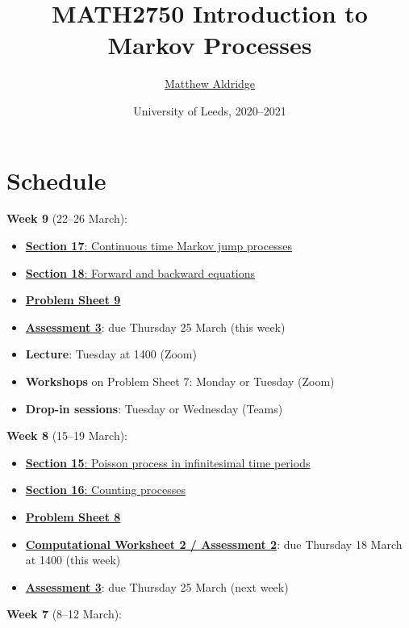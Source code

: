 \documentclass[
  a4paper,
]{article}
\title{MATH2750 Introduction to Markov Processes}
\author{\href{mailto:m.aldridge@leeds.ac.uk}{Matthew Aldridge}}
\date{University of Leeds, 2020--2021}
\providecommand{\tightlist}{%
  \setlength{\itemsep}{0pt}\setlength{\parskip}{0pt}}
\theoremstyle{definition}
\theoremstyle{definition}
\theoremstyle{definition}
\theoremstyle{remark}
\begin{document}
\maketitle

{
\setcounter{tocdepth}{2}
\tableofcontents
}
\hypertarget{home}{%
\section*{Schedule}\label{home}}

\textbf{Week 9} (22--26 March):

\begin{itemize}
\tightlist
\item
  \protect\hyperlink{S17-continuous-time}{\textbf{Section 17}: Continuous time Markov jump processes}
\item
  \protect\hyperlink{S18-forward-backward}{\textbf{Section 18}: Forward and backward equations}
\item
  \protect\hyperlink{P09}{\textbf{Problem Sheet 9}}
\item
  \protect\hyperlink{A3}{\textbf{Assessment 3}}: due Thursday 25 March (this week)
\item
  \textbf{Lecture}: Tuesday at 1400 (Zoom)
\item
  \textbf{Workshops} on Problem Sheet 7: Monday or Tuesday (Zoom)
\item
  \textbf{Drop-in sessions}: Tuesday or Wednesday (Teams)
\end{itemize}

\textbf{Week 8} (15--19 March):

\begin{itemize}
\tightlist
\item
  \protect\hyperlink{S15-poisson-infinitesimal}{\textbf{Section 15}: Poisson process in infinitesimal time periods}
\item
  \protect\hyperlink{S16-counting-processes}{\textbf{Section 16}: Counting processes}
\item
  \protect\hyperlink{P08}{\textbf{Problem Sheet 8}}
\item
  \protect\hyperlink{computing}{\textbf{Computational Worksheet 2 / Assessment 2}}: due Thursday 18 March at 1400 (this week)
\item
  \protect\hyperlink{A3}{\textbf{Assessment 3}}: due Thursday 25 March (next week)
\end{itemize}

\textbf{Week 7} (8--12 March):
\end{document}
